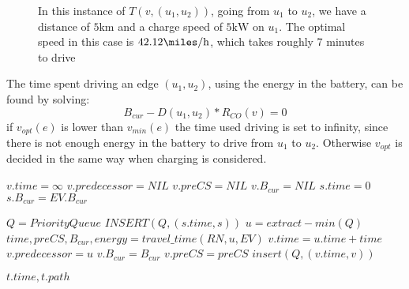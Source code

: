 \begin{figure}[!htb]
\label{fig:graph}
% 
\caption{In this instance of $T(v,(u_1, u_2))$, going from $u_1$ to $u_2$, we have a distance of $5 \si{\km}$ and a charge speed of $5 \si{\kW}$ on $u_1$. The optimal speed in this case is $42.12\si{\miles\per\hour}$, which takes roughly 7 minutes to drive}
\end{figure}


The time spent driving an edge $(u_1, u_2)$, using the energy in the battery, can be found by solving:
\[B_{cur} - D(u_1, u_2) * R_{CO}(v) = 0\] 
if $v_{opt}(e)$ is lower than $v_{min}(e)$ the time used driving is set to infinity, since there is not enough energy in the battery to drive from $u_1$ to $u_2$. Otherwise $v_{opt}$ is decided in the same way when charging is considered.



\begin{algorithmic}
		\State $v.time = \infty$
		\State $v.predecessor = NIL$
		\State $v.preCS = NIL$
		\State $v.B_{cur} = NIL$
	\EndFor
	\State $s.time = 0$
	\State $s.B_{cur} = EV.B_{cur}$

	\State $Q = PriorityQueue$
	\State $INSERT(Q, (s.time, s))$	
		\State $u = extract-min(Q)$
			\State $time,preCS,B_{cur},energy = travel\_time(RN, u, EV)$
				\State $v.time = u.time + time$
				\State $v.predecessor = u$
				\State $v.B_{cur} = B_{cur}$
				\State $v.preCS = preCS$
				\State $insert(Q, (v.time, v))$	
			\EndIf

		\EndFor
	\EndWhile
	\State \Return $t.time, t.path$
\EndFunction
\end{algorithmic}\label{alg:fastest_path}
